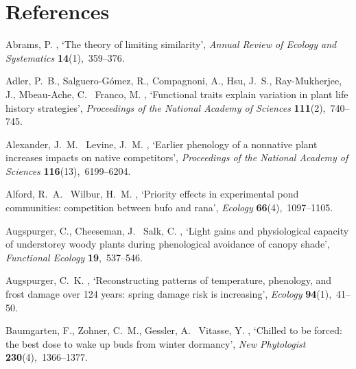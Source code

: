 \documentclass[11pt]{article}
\begin{document}
\section{References}
\begin{thebibliography}{xx}

Abrams, P.  \harvardyearright , `The theory of limiting
  similarity', {\em Annual Review of Ecology and Systematics} {\bf
  14}(1),~359--376.

Adler, P.~B., Salguero-G{\'o}mez, R., Compagnoni, A., Hsu, J.~S.,
  Ray-Mukherjee, J., Mbeau-Ache, C. \harvardand\ Franco, M.  \harvardyearright , `Functional traits explain variation in plant life
  history strategies', {\em Proceedings of the National Academy of Sciences}
  {\bf 111}(2),~740--745.

Alexander, J.~M. \harvardand\ Levine, J.~M.  \harvardyearright , `Earlier phenology of a nonnative plant increases
  impacts on native competitors', {\em Proceedings of the National Academy of
  Sciences} {\bf 116}(13),~6199--6204.

Alford, R.~A. \harvardand\ Wilbur, H.~M.  \harvardyearright , `Priority effects in experimental pond communities:
  competition between bufo and rana', {\em Ecology} {\bf 66}(4),~1097--1105.

Augspurger, C., Cheeseman, J. \harvardand\ Salk, C.  \harvardyearleft
  2005\harvardyearright , `Light gains and physiological capacity of
  understorey woody plants during phenological avoidance of canopy shade', {\em
  Functional Ecology} {\bf 19},~537--546.

Augspurger, C.~K.  \harvardyearright , `Reconstructing
  patterns of temperature, phenology, and frost damage over 124 years: spring
  damage risk is increasing', {\em Ecology} {\bf 94}(1),~41--50.

Baumgarten, F., Zohner, C.~M., Gessler, A. \harvardand\ Vitasse, Y.
  \harvardyearleft 2021\harvardyearright , `Chilled to be forced: the best dose
  to wake up buds from winter dormancy', {\em New Phytologist} {\bf
  230}(4),~1366--1377.


\end{thebibliography}
\end{document}
